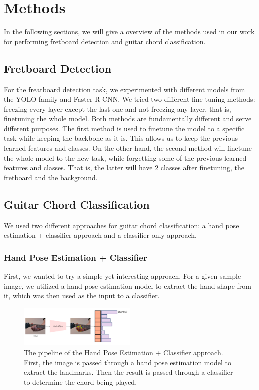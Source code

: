 \documentclass[10pt,twocolumn,letterpaper]{article}
\begin{document}
\section{Methods}
In the following sections, we will give a overview of the methods used in our work for performing fretboard detection and guitar chord classification.

\subsection{Fretboard Detection}
For the freatboard detection task, we experimented with different models from the YOLO family and Faster R-CNN. We tried two different fine-tuning methods: freezing every layer except the last one and not freezing any layer, that is, finetuning the whole model. Both methods are fundamentally different and serve different purposes. The first method is used to finetune the model to a specific task while keeping the backbone as it is. This allows us to keep the previous learned features and classes. On the other hand, the second method will finetune the
whole model to the new task, while forgetting some of the previous learned features and classes. That is, the latter will have 2 classes after finetuning, the fretboard and the background.


\subsection{Guitar Chord Classification}
We used two different approaches for guitar chord classification: a hand pose estimation + classifier approach and a classifier only approach.

\subsubsection{Hand Pose Estimation + Classifier}
First, we wanted to try a simple yet interesting approach. For a given sample image, we utilized a hand pose estimation model to extract the hand shape from it, which was then used as the input to a classifier.

\begin{figure}[h]
    \centering
    \includegraphics[width=0.5\textwidth]{images/final/hand_pose_estimation_classifier.png}
    \caption{The pipeline of the Hand Pose Estimation + Classifier approach. First, the image is passed through a hand pose estimation model to extract the landmarks. Then the result is passed through a classifier to determine the chord being played.}
    \label{fig:hand-pose-estimation-classifier}
\end{figure}
\end{document}
